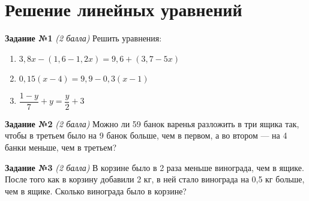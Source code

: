 \documentclass[12pt, a5paper]{article}
\begin{document}
		

\section*{Решение линейных уравнений}
\textbf{Задание №1} \textit{(2 балла)} Решить уравнения:
\begin{enumerate}[label=\asbuk*)]
	\item $3,8x-(1,6-1,2x)=9,6+(3,7-5x)$
	\item $0,15(x-4)=9,9-0,3(x-1)$
	\item $\dfrac{1-y}{7}+y=\dfrac{y}{2}+3$
\end{enumerate}


\textbf{Задание №2} \textit{(2 балла)} Можно ли 59 банок варенья разложить в три ящика так, чтобы в третьем было на 9 банок больше, чем в первом, а во втором — на 4 банки меньше, чем в третьем?

\textbf{Задание №3} \textit{(2 балла)} В корзине было в 2 раза меньше винограда, чем в ящике. После того как в корзину добавили 2 кг, в ней стало винограда на 0,5 кг больше, чем в ящике. Сколько винограда было в корзине?
\end{document}
